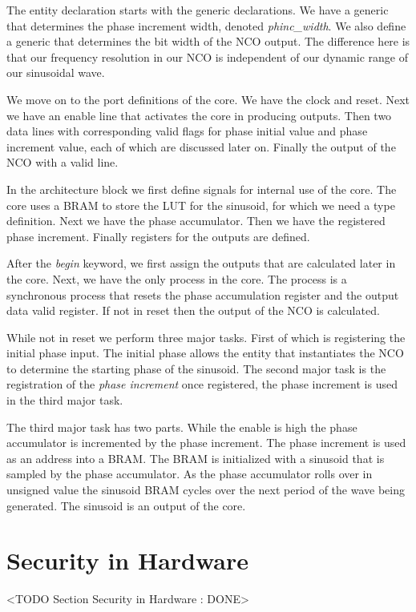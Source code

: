 The entity declaration starts with the generic declarations. We have a generic that determines the phase increment width, denoted \emph{phinc\_width}. We also define a generic that determines the bit width of the \ac{NCO} output. The difference here is that our frequency resolution in our \ac{NCO} is independent of our dynamic range of our sinusoidal wave. 

We move on to the port definitions of the core. We have the clock and reset. Next we have an enable line that activates the core in producing outputs. Then two data lines with corresponding valid flags for phase initial value and phase increment value, each of which are discussed later on. Finally the output of the \ac{NCO} with a valid line. 

In the architecture block we first define signals for internal use of the core. The core uses a \ac{BRAM} to store the \ac{LUT} for the sinusoid, for which we need a type definition. Next we have the phase accumulator. Then we have the registered phase increment. Finally registers for the outputs are defined.

After the \emph{begin} keyword, we first assign the outputs that are calculated later in the core. Next, we have the only process in the core. The process is a synchronous process that resets the phase accumulation register and the output data valid register. If not in reset then the output of the \ac{NCO} is calculated. 

While not in reset we perform three major tasks. First of which is registering the initial phase input. The initial phase allows the entity that instantiates the \ac{NCO} to determine the starting phase of the sinusoid. The second major task is the registration of the \emph{phase increment} once registered, the phase increment is used in the third major task.

The third major task has two parts. While the enable is high the phase accumulator is incremented by the phase increment. The phase increment is used as an address into a \ac{BRAM}. The \ac{BRAM} is initialized with a sinusoid that is sampled by the phase accumulator. As the phase accumulator rolls over in unsigned value the sinusoid \ac{BRAM} cycles over the next period of the wave being generated. The sinusoid is an output of the core. 

\section{Security in Hardware}
	<TODO Section Security in Hardware : DONE>

